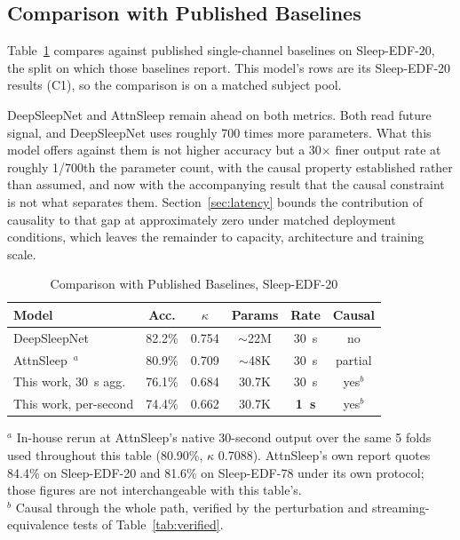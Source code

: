 \documentclass[conference]{IEEEtran}
\begin{document}
\subsection{Comparison with Published Baselines}
\label{sec:baselines}

Table~\ref{tab:baselines} compares against published single-channel baselines on Sleep-EDF-20, the
split on which those baselines report. This model's rows are its Sleep-EDF-20 results (C1), so the
comparison is on a matched subject pool.

DeepSleepNet and AttnSleep remain ahead on both metrics. Both read future signal, and DeepSleepNet
uses roughly 700 times more parameters. What this model offers against them is not higher accuracy
but a 30$\times$ finer output rate at roughly 1/700th the parameter count, with the causal property
established rather than assumed, and now with the accompanying result that the causal constraint is
not what separates them. Section~\ref{sec:latency} bounds the contribution of causality to that gap
at approximately zero under matched deployment conditions, which leaves the remainder to capacity,
architecture and training scale.

\begin{table}[t]
\caption{Comparison with Published Baselines, Sleep-EDF-20}
\label{tab:baselines}
\centering
\begin{tabular}{lccccc}
\toprule
Model & Acc. & $\kappa$ & Params & Rate & Causal \\
\midrule
DeepSleepNet~\cite{deepsleepnet} & 82.2\% & 0.754 & $\sim$22M & 30~s & no \\
AttnSleep~\cite{attnsleep}$^{a}$ & 80.9\% & 0.709 & $\sim$48K & 30~s & partial \\
This work, 30~s agg.             & 76.1\% & 0.684 & 30.7K & 30~s & yes$^{b}$ \\
This work, per-second            & 74.4\% & 0.662 & 30.7K & \textbf{1~s} & yes$^{b}$ \\
\bottomrule
\end{tabular}
\begin{flushleft}
\footnotesize
$^{a}$ In-house rerun at AttnSleep's native 30-second output over the same 5 folds used throughout
this table (80.90\%, $\kappa$ 0.7088). AttnSleep's own report quotes 84.4\% on Sleep-EDF-20 and
81.6\% on Sleep-EDF-78 under its own protocol; those figures are not interchangeable with this
table's.\\
$^{b}$ Causal through the whole path, verified by the perturbation and streaming-equivalence tests of
Table~\ref{tab:verified}.
\end{flushleft}
\end{table}
\end{document}

